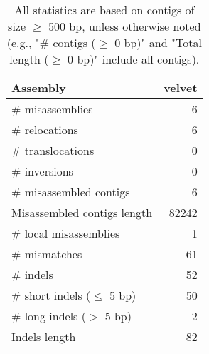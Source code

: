 \documentclass[12pt,a4paper]{article}
\begin{document}
\begin{table}[ht]
\begin{center}
\caption{All statistics are based on contigs of size $\geq$ 500 bp, unless otherwise noted (e.g., "\# contigs ($\geq$ 0 bp)" and "Total length ($\geq$ 0 bp)" include all contigs).}
\begin{tabular}{|l*{1}{|r}|}
\hline
Assembly & velvet \\ \hline
\# misassemblies & 6 \\ \hline
\hspace{5mm}\# relocations & 6 \\ \hline
\hspace{5mm}\# translocations & 0 \\ \hline
\hspace{5mm}\# inversions & 0 \\ \hline
\# misassembled contigs & 6 \\ \hline
Misassembled contigs length & 82242 \\ \hline
\# local misassemblies & 1 \\ \hline
\# mismatches & 61 \\ \hline
\# indels & 52 \\ \hline
\hspace{5mm}\# short indels ($\leq$ 5 bp) & 50 \\ \hline
\hspace{5mm}\# long indels ($>$ 5 bp) & 2 \\ \hline
Indels length & 82 \\ \hline
\end{tabular}
\end{center}
\end{table}
\end{document}
